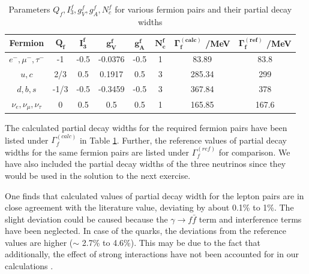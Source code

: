 \begin{table}[h!]
\centering
\begin{tabular}{|c|c|c|c|c|c|c|c|}
\hline
\textbf{Fermion} & $\mathbf{Q_{f}}$ & $\mathbf{I_{3}^{f}}$ & $\mathbf{g_{V}^{f}}$ & $\mathbf{g_{A}^{f}}$ & $\mathbf{N_{c}^{f}}$ & $\mathbf{\Gamma_{f}^{(calc)}}$ /\textbf{MeV} & $\mathbf{\Gamma_{f}^{(ref)}}$ /\textbf{MeV}\\
\hline
$e^{-}, \mu^{-}, \tau^{-}$ & -1 & -0.5 & -0.0376 & -0.5 & 1 & 83.89 & 83.8\\
\hline
$u,c$ & 2/3 & 0.5 & 0.1917 & 0.5 & 3 & 285.34 & 299\\
\hline
$d, b, s$ & -1/3 & -0.5 & -0.3459 & -0.5 & 3 & 367.84 & 378\\
\hline
$\nu_{e}, \nu_{\mu}, \nu_{\tau}$ & 0 & 0.5 & 0.5 & 0.5 & 1 & 165.85 & 167.6\\
\hline
\end{tabular}
\caption{Parameters $Q_{f}, I_{3}^{f}, g_{V}^{f}, g_{A}^{f}, N_{c}^{f}$ for various fermion pairs and their partial decay widths}
\label{partialdecays}
\end{table}

The calculated partial decay widths for the required fermion pairs have been listed under $\Gamma_{f}^{(calc)}$ in Table \ref{partialdecays}. Further, the reference \cite{UB} values of partial decay widths for the same fermion pairs are listed under $\Gamma_{f}^{(ref)}$ for comparison. We have also included the partial decay widths of the three neutrinos since they would be used in the solution to the next exercise. 

One finds that calculated values of partial decay width for the lepton pairs are in close agreement with the literature value, deviating by about 0.1\% to 1\%. The slight deviation could be caused because the $\gamma\rightarrow f\bar{f}$ term \cite{Ver} and interference terms have been neglected. In case of the quarks, the deviations from the reference values are higher ($\sim$ 2.7\% to 4.6\%). This may be due to the fact that additionally, the effect of strong interactions have not been accounted for in our calculations \cite{Anna}.


